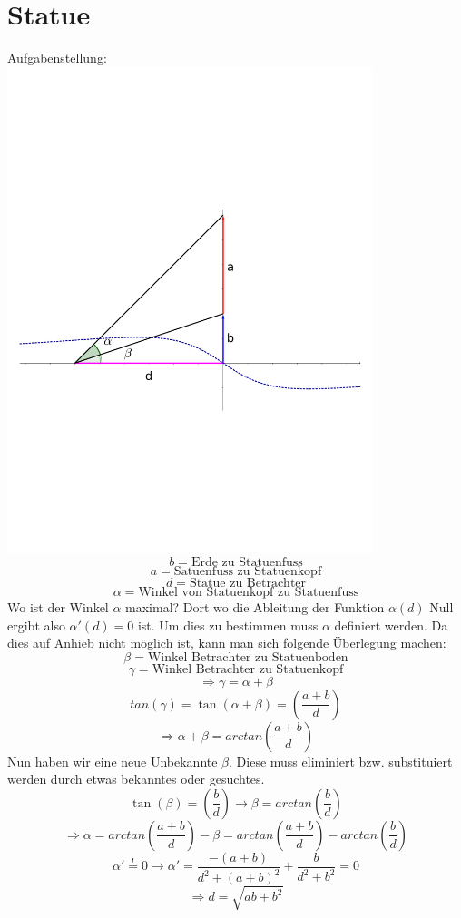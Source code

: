 \section{Statue}
Aufgabenstellung: \\
\includegraphics[width=0.8\textwidth]{bilder/statue.pdf}
\[ b = \text{Erde zu Statuenfuss} \]
\[ a = \text{Satuenfuss zu Statuenkopf} \]
\[ d = \text{Statue zu Betrachter} \]
\[ \alpha = \text{Winkel von Statuenkopf zu Statuenfuss} \]
Wo ist der Winkel $\alpha$ maximal? Dort wo die Ableitung der Funktion $\alpha(d)$ Null ergibt also $\alpha'(d)=0$ ist. 
Um dies zu bestimmen muss $\alpha$ definiert werden. 
Da dies auf Anhieb nicht möglich ist, kann man sich folgende Überlegung machen:
\[ \beta = \text{Winkel Betrachter zu Statuenboden} \]
\[ \gamma = \text{Winkel Betrachter zu Statuenkopf} \]
\[ \Rightarrow \gamma = \alpha + \beta \]
\[ tan(\gamma) = \tan(\alpha + \beta) = \left(\frac{a+b}{d}\right) \]
\[ \Rightarrow \alpha + \beta = arctan\left(\frac{a+b}{d}\right) \]
Nun haben wir eine neue Unbekannte $\beta$. Diese muss eliminiert bzw. substituiert werden durch etwas bekanntes oder gesuchtes.
\[ \tan(\beta) = \left(\frac{b}{d}\right) \rightarrow \beta = arctan\left(\frac{b}{d}\right) \]
\[ \Rightarrow \alpha = arctan\left(\frac{a+b}{d}\right) - \beta = arctan\left(\frac{a+b}{d}\right) - arctan\left(\frac{b}{d}\right) \]
\[ \alpha' \stackrel{!}{=} 0 \rightarrow \alpha' = \frac{-(a+b)}{d^2 + (a+b)^2} + \frac{b}{d^2 + b^2} = 0 \]
\[ \Rightarrow d = \sqrt{ab + b^2} \]
